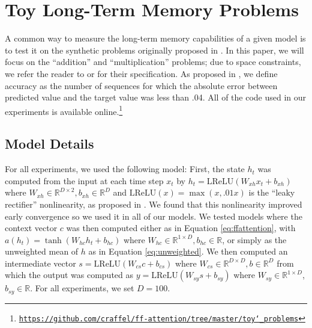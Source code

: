 \documentclass{article} %
\begin{document}
\section{Toy Long-Term Memory Problems}

A common way to measure the long-term memory capabilities of a given model is to test it on the synthetic problems originally proposed in \cite{hochreiter1997long}.
In this paper, we will focus on the ``addition'' and ``multiplication'' problems; due to space constraints, we refer the reader to \cite{hochreiter1997long} or \cite{sutskever2013importance} for their specification.
As proposed in \cite{hochreiter1997long}, we define accuracy as the number of sequences for which the absolute error between predicted value and the target value was less than .04.
All of the code used in our experiments is available online.\footnote{\href{https://github.com/craffel/ff-attention/tree/master/toy_problems}{\texttt{https://github.com/craffel/ff-attention/tree/master/toy\char`_problems}}}

\subsection{Model Details}

For all experiments, we used the following model:
First, the state $h_t$ was computed from the input at each time step $x_t$ by $h_t = \textrm{LReLU}(W_{xh}x_t + b_{xh})$ where $W_{xh} \in \mathbb{R}^{D \times 2}, b_{xh} \in \mathbb{R}^D$ and $\textrm{LReLU}(x) = \max(x, .01x)$ is the ``leaky rectifier'' nonlinearity, as proposed in \cite{maas2013rectifier}.
We found that this nonlinearity improved early convergence so we used it in all of our models.
We tested models where the context vector $c$ was then computed either as in Equation \ref{eq:ffattention}, with $a(h_t) =\tanh(W_{hc}h_t + b_{hc})$
where $W_{hc} \in \mathbb{R}^{1 \times D}, b_{hc} \in \mathbb{R}$, or simply as the unweighted mean of $h$ as in Equation \ref{eq:unweighted}.
We then computed an intermediate vector $s = \textrm{LReLU}(W_{cs}c + b_{cs})$ where $W_{cs} \in \mathbb{R}^{D \times D}, b \in \mathbb{R}^D$ from which the output was computed as $y = \textrm{LReLU}(W_{sy}s + b_{sy})$ where $W_{sy} \in \mathbb{R}^{1 \times D}$, $b_{sy} \in \mathbb{R}$.
For all experiments, we set $D = 100$.
\end{document}
